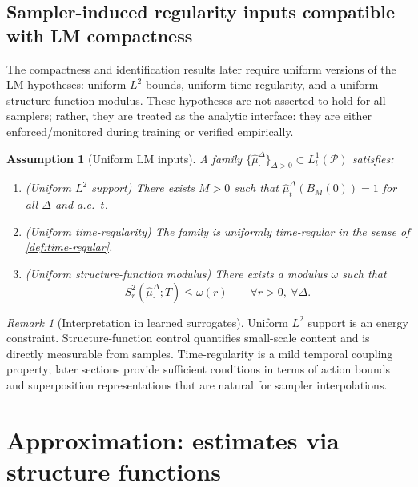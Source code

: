 \documentclass{article}
\numberwithin{equation}{section}
\theoremstyle{plain}
\newtheorem{assumption}[theorem]{Assumption}
\theoremstyle{definition}
\theoremstyle{remark}
\newtheorem{remark}[theorem]{Remark}
\newcommand{\Pcal}{\mathcal{P}}
\begin{document}
\subsection{Sampler-induced regularity inputs compatible with LM compactness}

The compactness and identification results later require uniform versions of the LM hypotheses: uniform $L^2$ bounds,
uniform time-regularity, and a uniform structure-function modulus. These hypotheses are not asserted to hold for all
samplers; rather, they are treated as the analytic interface: they are either enforced/monitored during training or
verified empirically.

\begin{assumption}[Uniform LM inputs]\label{ass:LM-inputs}
A family $\{\widehat\mu^\Delta_\cdot\}_{\Delta>0}\subset L^1_t(\Pcal)$ satisfies:
\begin{enumerate}[label=(\roman*),leftmargin=2.2em]
\item (\emph{Uniform $L^2$ support}) There exists $M>0$ such that $\widehat\mu^\Delta_t(B_M(0))=1$ for all $\Delta$ and a.e.\ $t$.
\item (\emph{Uniform time-regularity}) The family is uniformly time-regular in the sense of \cref{def:time-regular}.
\item (\emph{Uniform structure-function modulus}) There exists a modulus $\omega$ such that
\[
S_r^2(\widehat\mu^\Delta_\cdot;T)\le \omega(r)\qquad\forall r>0,\ \forall \Delta.
\]
\end{enumerate}
\end{assumption}

\begin{remark}[Interpretation in learned surrogates]
Uniform $L^2$ support is an energy constraint. Structure-function control quantifies small-scale content and is directly
measurable from samples. Time-regularity is a mild temporal coupling property; later sections provide sufficient
conditions in terms of action bounds and superposition representations that are natural for sampler interpolations.
\end{remark}



\section{Approximation: estimates via structure functions}
\label{sec:approx}
\end{document}
